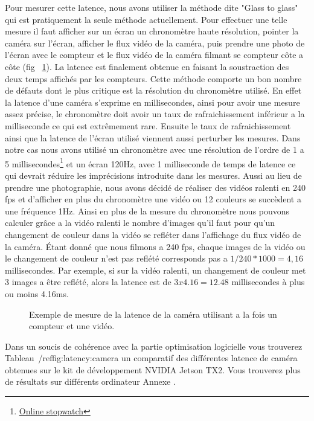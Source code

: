 Pour mesurer cette latence, nous avons utiliser la méthode dite "Glass to glass" qui est pratiquement la seule méthode actuellement. Pour effectuer une telle mesure il faut afficher sur un écran un chronomètre haute résolution, pointer la caméra sur l'écran, afficher le flux vidéo de la caméra, puis prendre une photo de l'écran avec le compteur et le flux vidéo de la caméra filmant se compteur côte a côte (fig ~\ref{fig:latency:glasstoglass}). La latence est finalement obtenue en faisant la soustraction des deux temps affichés par les compteurs. Cette méthode comporte un bon nombre de défauts dont le plus critique est la résolution du chronomètre utilisé. En effet la latence d'une caméra s'exprime en millisecondes, ainsi pour avoir une mesure assez précise, le chronomètre doit avoir un taux de rafraichissement inférieur a la milliseconde ce qui est extrêmement rare. Ensuite le taux de rafraichissement ainsi que la latence de l'écran utilisé viennent aussi perturber les mesures. Dans notre cas nous avons utilisé un chronomètre avec une résolution de l'ordre de 1 a 5 millisecondes\footnote{\href{https://stopwatch.onlineclock.net/}{Online stopwatch}} et un écran 120Hz, avec 1 milliseconde de temps de latence ce qui devrait réduire les imprécisions introduite dans les mesures. Aussi au lieu de prendre une photographie, nous avons décidé de réaliser des vidéos ralenti en 240 fps et d'afficher en plus du chronomètre une vidéo ou 12 couleurs se succèdent a une fréquence 1Hz. Ainsi en plus de la mesure du chronomètre nous pouvons calculer grâce a la vidéo ralenti le nombre d'images qu'il faut pour qu'un changement de couleur dans la vidéo se refléter dans l'affichage du flux vidéo de la caméra. Étant donné que nous filmons a 240 fps, chaque images de la vidéo ou le changement de couleur n'est pas reflété corresponds pas a $1/240 * 1000 = 4,16$ millisecondes. Par exemple, si sur la vidéo ralenti, un changement de couleur met 3 images a être reflété, alors la latence est de $3 x 4.16 = 12.48$ millisecondes à plus ou moins 4.16ms.

\begin{figure}[H]
\caption{Exemple de mesure de la latence de la caméra utilisant a la fois un compteur et une vidéo.}
\label{fig:latency:glasstoglass}
\end{figure}
Dans un soucis de cohérence avec la partie optimisation logicielle vous trouverez Tableau~/ref{fig:latency:camera} un comparatif des différentes latence de caméra obtenues sur le kit de développement NVIDIA Jetson TX2. Vous trouverez plus de résultats sur différents ordinateur Annexe %
.

